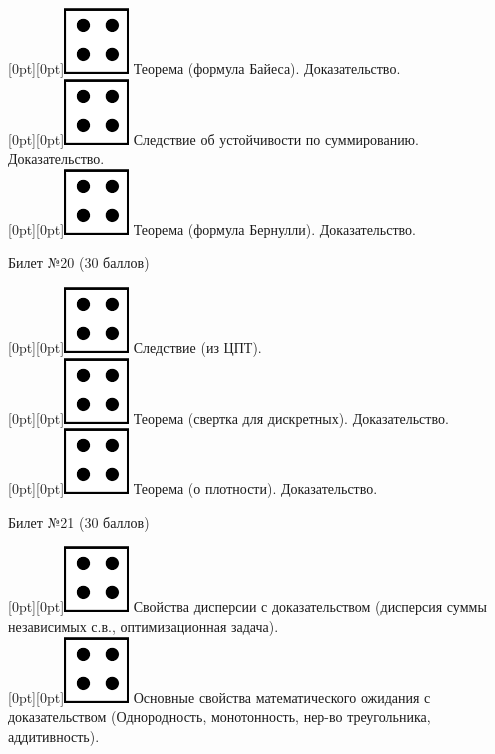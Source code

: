 \documentclass[10pt]{article}
\begin{document}
\raisebox{-1pt}[0pt][0pt]{\includegraphics[width=0.02\linewidth]{4.png}} Теорема (формула Байеса). Доказательство. \\
\raisebox{-1pt}[0pt][0pt]{\includegraphics[width=0.02\linewidth]{4.png}} Следствие об устойчивости по суммированию. Доказательство. \\
\raisebox{-1pt}[0pt][0pt]{\includegraphics[width=0.02\linewidth]{4.png}} Теорема (формула Бернулли). Доказательство. \\
\begin{center} {\Large Билет №20 (30 баллов)} \end{center}
\raisebox{-1pt}[0pt][0pt]{\includegraphics[width=0.02\linewidth]{4.png}} Следствие (из ЦПТ). \\
\raisebox{-1pt}[0pt][0pt]{\includegraphics[width=0.02\linewidth]{4.png}} Теорема (свертка для дискретных).  Доказательство. \\
\raisebox{-1pt}[0pt][0pt]{\includegraphics[width=0.02\linewidth]{4.png}} Теорема (о плотности). Доказательство. \\
\begin{center} {\Large Билет №21 (30 баллов)} \end{center}
\raisebox{-1pt}[0pt][0pt]{\includegraphics[width=0.02\linewidth]{4.png}} Свойства дисперсии с доказательством (дисперсия суммы независимых с.в., оптимизационная задача). \\ 
\raisebox{-1pt}[0pt][0pt]{\includegraphics[width=0.02\linewidth]{4.png}} Основные свойства математического ожидания с доказательством (Однородность, монотонность, нер-во треугольника, аддитивность). \\
\end{document}

